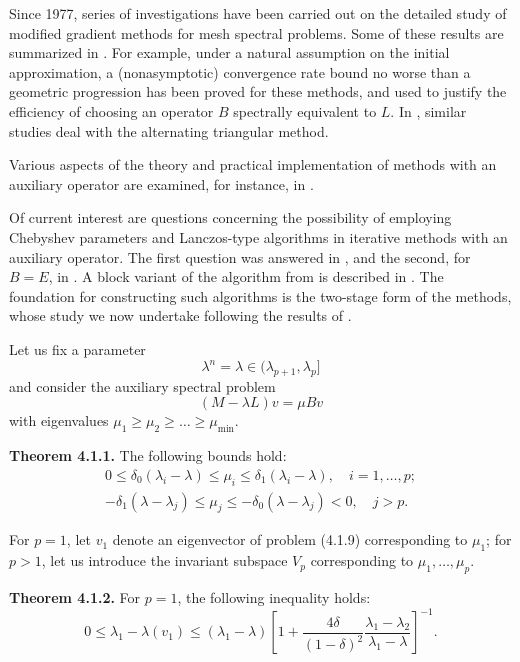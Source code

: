 \documentclass[11pt,oneside]{book}
\begin{document}
Since 1977, series of investigations have been carried out on the detailed study of modified gradient methods for mesh spectral problems. Some of these results are summarized in \citep{DyakonovOrekhov1980,Dyakonov1983,Dyakonov1986en}. For example, under a natural assumption on the initial approximation, a (nonasymptotic) convergence rate bound no worse than a geometric progression has been proved for these methods, and used to justify the efficiency of choosing an operator $B$ spectrally equivalent to $L$. In \citep{Prikazchikov1980,PrikazchikovKhimich1984}, similar studies deal with the alternating triangular method.

Various aspects of the theory and practical implementation of methods with an auxiliary operator are examined, for instance, in \citep{Prokopov1968,Strakhovskaya1977,Orekhov1980,ZhukPrikazchikov1982}.

Of current interest are questions concerning the possibility of employing Chebyshev parameters and Lanczos-type algorithms in iterative methods with an auxiliary operator. The first question was answered in \citep{GavrilinIlin1981,Ilin1985}, and the second, for $B = E$, in \citep{Scott1981}. A block variant of the algorithm from \citep{Scott1981} is described in \citep{Zhihao1983}. The foundation for constructing such algorithms is the two-stage form of the methods, whose study we now undertake following the results of \citep{Knyazev1983b}.

Let us fix a parameter
\[
\lambda^n = \lambda \in (\lambda_{p+1}, \lambda_p] \tag{4.1.8}
\]
and consider the auxiliary spectral problem
\[
(M - \lambda L) v = \mu B v \tag{4.1.9}
\]
with eigenvalues $\mu_1 \geqslant \mu_2 \geqslant \ldots \geqslant \mu_{\min}$.

\textbf{Theorem 4.1.1.} The following bounds hold:
\begin{gather*}
0 \leqslant \delta_0 (\lambda_i - \lambda) \leqslant \mu_i \leqslant \delta_1 (\lambda_i - \lambda), \quad i = 1, \ldots, p; \tag{4.1.10} \\
- \delta_1 (\lambda - \lambda_j) \leqslant \mu_j \leqslant - \delta_0 (\lambda - \lambda_j) < 0, \quad j > p. \tag{4.1.11}
\end{gather*}

For $p = 1$, let $v_1$ denote an eigenvector of problem (4.1.9) corresponding to $\mu_1$; for $p > 1$, let us introduce the invariant subspace $V_p$ corresponding to $\mu_1, \ldots, \mu_p$.

\textbf{Theorem 4.1.2.} For $p = 1$, the following inequality holds:
\[
0 \leqslant \lambda_1 - \lambda(v_1) \leqslant (\lambda_1 - \lambda) \left[ 1 + \frac{4\delta}{(1 - \delta)^2} \frac{\lambda_1 - \lambda_2}{\lambda_1 - \lambda} \right]^{-1}. \tag{4.1.12}
\]
\end{document}
